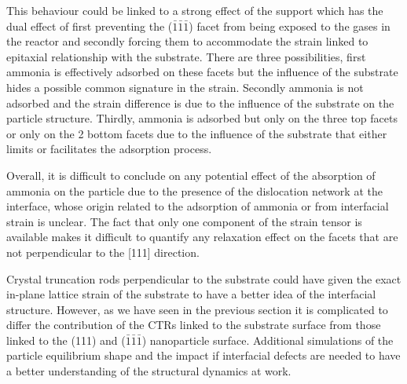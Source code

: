 {This behaviour could be linked to a strong effect of the support which has the dual effect of first preventing the ($\bar{1}\bar{1}\bar{1}$) facet from being exposed to the gases in the reactor and secondly forcing them to accommodate the strain linked to epitaxial relationship with the substrate.
There are three possibilities, first ammonia is effectively adsorbed on these facets but the influence of the substrate hides a possible common signature in the strain.
Secondly ammonia is not adsorbed and the strain difference is due to the influence of the substrate on the particle structure.
Thirdly, ammonia is adsorbed but only on the three top facets or only on the 2 bottom facets due to the influence of the substrate that either limits or facilitates the adsorption process.



Overall, it is difficult to conclude on any potential effect of the absorption of ammonia on the particle due to the presence of the dislocation network at the interface, whose origin related to the adsorption of ammonia or from interfacial strain is unclear.
The fact that only one component of the strain tensor is available makes it difficult to quantify any relaxation effect on the facets that are not perpendicular to the [111] direction.

Crystal truncation rods perpendicular to the substrate could have given the exact in-plane lattice strain of the substrate to have a better idea of the interfacial structure.
However, as we have seen in the previous section it is complicated to differ the contribution of the CTRs linked to the substrate surface from those linked to the (111) and ($\bar{1}\bar{1}\bar{1}$) nanoparticle surface.
Additional simulations of the particle equilibrium shape and the impact if interfacial defects are needed to have a better understanding of the structural dynamics at work.

}
